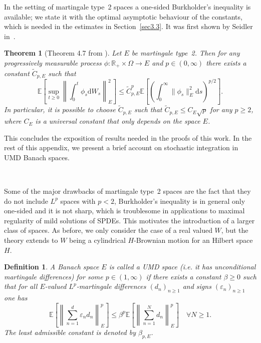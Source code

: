 \documentclass[10pt]{article}
\newcommand{\mathd}{\mathrm{d}}
\newtheorem{definition}{Definition}
\newtheorem{theorem}{Theorem}
\begin{document}
In the setting of martingale type~2 spaces a one-sided Burkholder's inequality
is available; we state it with the optimal asymptotic behaviour of the
constants, which is needed in the estimates in Section~\ref{sec3.3}. It was
first shown by Seidler in~{\cite{seidler}}.

\begin{theorem}[Theorem 4.7 from {\cite{vanneerven2015}}]
  \label{appendixA3 thm burkholder}Let $E$ be martingale type~2. Then for any
  progressively measurable process $\phi : \mathbb{R}_+ \times \Omega
  \rightarrow E$ and $p \in (0, \infty)$ there exists a constant
  $\tilde{C}_{p, E}$ such that
  \begin{equation}
    \mathbb{E} \left[ \sup_{t \geqslant 0} \left\| \int_0^t \phi_s \mathd W_s
    \right\|_E^2 \right] \leqslant \tilde{C}_{p, E}^p \mathbb{E} \left[ \left(
    \int_0^{\infty} \| \phi_s \|^2_E \mathd s \right)^{p / 2} \right] .
    \label{appendixA3 burkholder}
  \end{equation}
  In particular, it is possible to choose $\tilde{C}_{p, E}$ such that
  $\tilde{C}_{p, E} \leqslant C_E \sqrt{p}$ for any $p \geqslant 2$, where
  $C_E$ is a universal constant that only depends on the space $E$.
\end{theorem}

This concludes the exposition of results needed in the proofs of this work. In
the rest of this appendix, we present a brief account on stochastic
integration in UMD Banach spaces.

\

Some of the major drawbacks of martingale type~2 spaces are the fact that
they do not include $L^p$ spaces with $p < 2$, Burkholder's inequality is in
general only one-sided and it is not sharp, which is troublesome in
applications to maximal regularity of mild solutions of SPDEs. This motivates
the introduction of a larger class of spaces. As before, we only consider the
case of a real valued $W$, but the theory extends to $W$ being a cylindrical
$H$\mbox{-}Brownian motion for an Hilbert space $H$.

\begin{definition}
  \label{appendixA3 defn UMD} A Banach space $E$ is called a UMD space (i.e.
  it has unconditional martingale differences) for some $p \in (1, \infty)$ if
  there exists a constant $\beta \geqslant 0$ such that for all
  $E$\mbox{-}valued $L^p$\mbox{-}martingale differences $(d_n)_{n \geqslant
  1}$ and signs $(\varepsilon_n)_{n \geqslant 1}$ one has
  \[ \mathbb{E} \left[ \left\| \sum_{n = 1}^d \varepsilon_n d_n \right\|_E^p
     \right] \leqslant \beta^p \mathbb{E} \left[ \left\| \sum_{n = 1}^N d_n
     \right\|_E^p \right] \quad \forall N \geqslant 1. \]
  The least admissible constant is denoted by $\beta_{p, E}$.
\end{definition}
\end{document}
